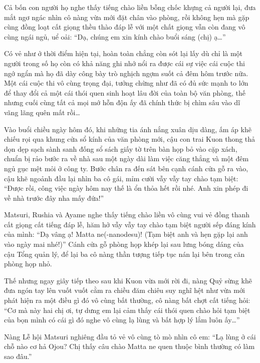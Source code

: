 \documentclass[../main.tex]{subfiles}
\begin{document}
Cả bốn con người họ nghe thấy tiếng chào liền bỗng chốc khựng cả người lại, đưa mắt ngơ ngác nhìn cô nàng vừa mới đặt chân vào phòng, rồi không hẹn mà gặp cùng đồng loạt cất giọng thều thào đáp lễ với một chất giọng vẫn còn đang vô cùng ngái ngủ, uể oải: ``Dạ, chúng em xin kính chào buổi sáng (chị) ạ\dots''

Có vẻ như ở thời điểm hiện tại, hoàn toàn chẳng còn sót lại lấy dù chỉ là một người trong số họ còn có khả năng ghi nhớ nổi ra được cái sự việc cái cuộc thi ngớ ngẩn mà họ đã dày công bày trò nghịch ngợm suốt cả đêm hôm trước nữa. Một cái cuộc thi vô cùng trọng đại, tưởng chừng như đã có đủ sức mạnh to lớn để thay đổi cả một cái thói quen sinh hoạt lâu đời của toàn bộ văn phòng, thế nhưng cuối cùng tất cả mọi mớ hỗn độn ấy đã chính thức bị chìm sâu vào dĩ vãng lãng quên mất rồi\dots

\omk

Vào buổi chiều ngày hôm đó, khi những tia ánh nắng xuân dịu dàng, ấm áp khẽ chiếu rọi qua khung cửa sổ kính của văn phòng mới, cậu con trai Kuon thong thả dọn dẹp sạch sành sanh đống sổ sách giấy tờ trên bàn họp bỏ vào cặp xách, chuẩn bị rảo bước ra về nhà sau một ngày dài làm việc căng thẳng và một đêm ngủ gục mệt mỏi ở công ty. Bước chân ra đến sát bên cạnh cánh cửa gỗ ra vào, cậu khẽ ngoảnh đầu lại nhìn ba cô gái, mỉm cười vẫy vẫy tay chào tạm biệt: ``Được rồi, công việc ngày hôm nay thế là ổn thỏa hết rồi nhé. Anh xin phép đi về nhà trước đây nha mấy đứa!''

Matsuri, Rushia và Ayame nghe thấy tiếng chào liền vô cùng vui vẻ đồng thanh cất giọng cất tiếng đáp lễ, hăm hở vẫy vẫy tay chào tạm biệt người sếp đáng kính của mình: ``Dạ vâng ạ! Matta ne(-nanodesu)! (Tạm biệt anh và hẹn gặp lại anh vào ngày mai nhé!)'' Cánh cửa gỗ phòng họp khép lại sau lưng bóng dáng của cậu Tổng quản lý, để lại ba cô nàng thần tượng tiếp tục nán lại bên trong căn phòng họp nhỏ.

Thế nhưng ngay giây tiếp theo sau khi Kuon vừa mới rời đi, nàng Quỷ sừng khẽ đưa ngón tay lên vuốt vuốt cằm ra chiều đăm chiêu suy nghĩ hệt như vừa mới phát hiện ra một điều gì đó vô cùng bất thường, cô nàng bất chợt cất tiếng hỏi: ``Cơ mà này hai chị ơi, tự dưng em lại cảm thấy cái thói quen chào hỏi tạm biệt của bọn mình có cái gì đó nghe vô cùng lạ lùng và bất hợp lý lắm luôn ấy\dots''

Nàng Lễ hội Matsuri nghiêng đầu tỏ vẻ vô cùng tò mò nhìn cô em: ``Lạ lùng ở cái chỗ nào cơ hả Ojou? Chị thấy câu chào Matta ne quen thuộc bình thường có làm sao đâu.''
\end{document}
